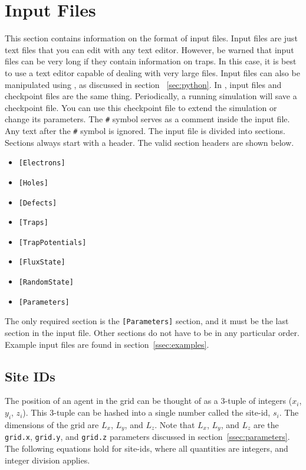\newpage
\section{Input Files}
\label{sec:input}
This section contains information on the format of \Langmuir input files.
Input files are just text files that you can edit with any text editor.
However, be warned that input files can be very long if they contain
    information on traps.
In this case, it is best to use a text editor capable of dealing with
    very large files.
Input files can also be manipulated using \LangmuirPython, as discussed
    in section ~\ref{sec:python}.
In \Langmuir, input files and checkpoint files are the same thing.
Periodically, a running simulation will save a checkpoint file.
You can use this checkpoint file to extend the simulation or change
    its parameters.
The \verb|#| symbol serves as a comment inside the input file.
Any text after the \verb|#| symbol is ignored.
The input file is divided into sections.
Sections always start with a header.
The valid section headers are shown below.

\begin{itemize}
    \item \verb|[Electrons]|
    \item \verb|[Holes]|
    \item \verb|[Defects]|
    \item \verb|[Traps]|
    \item \verb|[TrapPotentials]|
    \item \verb|[FluxState]|
    \item \verb|[RandomState]|
    \item \verb|[Parameters]|
\end{itemize}

The only required section is the \verb|[Parameters]| section,
    and it must be the last section in the input file.
Other sections do not have to be in any particular order.
Example input files are found in section~\ref{ssec:examples}.

\subsection{Site IDs}
    \label{ssec:sites}
    The position of an agent in the grid can be thought of as a 3-tuple
        of integers ($x_{i}$, $y_{i}$, $z_{i}$).
    This 3-tuple can be hashed into a single number called
        the site-id, $s_{i}$.
    The dimensions of the grid are $L_{x}$, $L_{y}$, and $L_{z}$.
    Note that $L_{x}$, $L_{y}$, and $L_{z}$ are the \verb|grid.x|,
        \verb|grid.y|, and \verb|grid.z| parameters discussed in
        section~\ref{ssec:parameters}.
    The following equations hold for site-ids, where all quantities
        are integers, and integer division applies.

